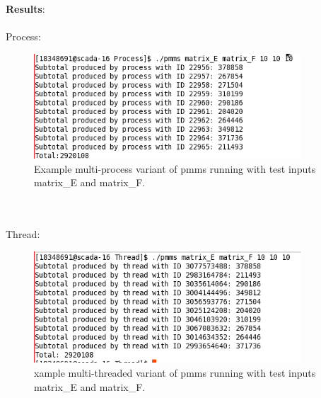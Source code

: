 \documentclass{article}
\begin{document}
\textbf{Results}:
\\\\
Process:
\begin{figure}[!htb]
  \centering
  \includegraphics[width=10cm]{process_meXmf.png}
  \caption{Example multi-process variant of pmms running with test inputs
            matrix_E and matrix_F.}
  \label{fig:example}
\end{figure}
\\\\
Thread:
\begin{figure}[!htb]
  \centering
  \includegraphics[width=10cm]{thread_meXmf.png}
  \caption{xample multi-threaded variant of pmms running with test inputs
            matrix_E and matrix_F.}
  \label{fig:example}
\end{figure}
\end{document}
